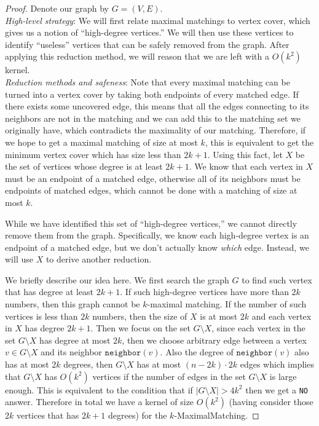 \documentclass{article}
\begin{document}
\begin{proof} Denote our graph by $G=(V,E)$. \\

\noindent \emph{High-level strategy}: We will first relate maximal matchings to vertex cover, which gives us a notion of ``high-degree vertices.'' We will then use these vertices to identify ``useless'' vertices that can be safely removed from the graph. After applying this reduction method, we will reason that we are left with a $O(k^2)$ kernel.\\

\noindent \emph{Reduction methods and safeness}: Note that every maximal matching can be turned into a vertex cover by taking both endpoints of every matched edge. If there exists some uncovered edge, this means that all the edges connecting to its neighbors are not in the matching and we can add this to the matching set we originally have, which contradicts the maximality of our matching. Therefore, if we hope to get a maximal matching of size at most $k$, this is equivalent to get the minimum vertex cover which has size less than \(2k+1\). Using this fact, let $X$ be the set of vertices whose degree is at least $2k+1$. We know that each vertex in $X$ must be an endpoint of a matched edge, otherwise all of its neighbors must be endpoints of matched edges, which cannot be done with a matching of size at most $k$.

While we have identified this set of ``high-degree vertices,'' we cannot directly remove them from the graph. Specifically, we know each high-degree vertex is an endpoint of a matched edge, but we don't actually know \emph{which} edge. Instead, we will use $X$ to derive another reduction. 

We briefly describe our idea here. We first search the graph \(G\) to find such vertex that has degree at least \(2k+1\). If such high-degree vertices have more than \(2k\) numbers, then this graph cannot be \(k\)-maximal matching. If the number of such vertices is less than \(2k\) numbers, then the size of \(X\) is at most \(2k\) and each vertex in \(X\) has degree \(2k+1\). Then we focus on the set \(G\setminus X\), since each vertex in the set \(G \setminus X\) has degree at most \(2k\), then we choose arbitrary edge between a vertex \(v \in G\setminus X\) and its neighbor \(\texttt{neighbor}(v)\). Also the degree of \(\texttt{neighbor}(v)\) also has at most \(2k\) degrees, then \(G\setminus X\) has at most \((n-2k)\cdot 2k\) edges which implies that \(G \setminus X\) has \(O(k^2)\) vertices if the number of edges in the set \(G \setminus X\) is large enough. This is equivalent to the condition that if \(|G\setminus X| > 4k^2\) then we get a \texttt{NO} answer. Therefore in total we have a kernel of size \(O(k^2)\) (having consider those \(2k\) vertices that has \(2k+1\) degrees) for the \(k\)-MaximalMatching.




\end{proof}
\end{document}

